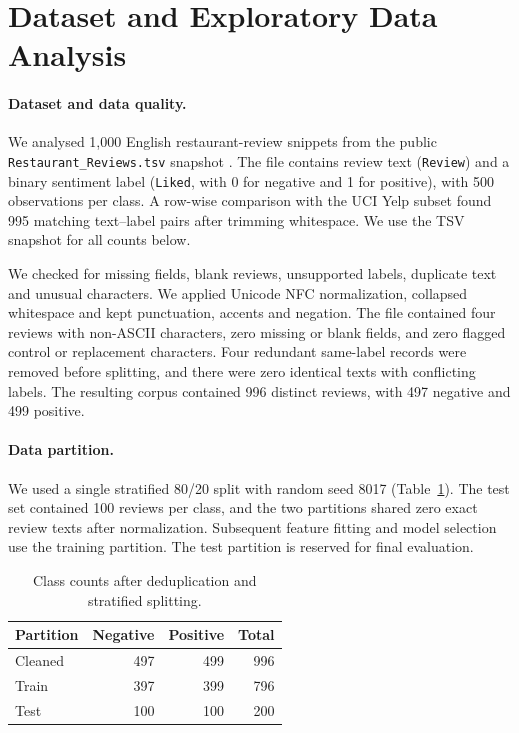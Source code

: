 \section{Dataset and Exploratory Data Analysis}
\label{sec:data-eda}

\paragraph{Dataset and data quality.}
We analysed 1,000 English restaurant-review snippets from the public
\texttt{Restaurant\_Reviews.tsv} snapshot
\citep{rajagopal-restaurant-reviews}. The file contains review text
(\texttt{Review}) and a binary sentiment label (\texttt{Liked}, with 0
for negative and 1 for positive), with 500 observations per class.
A row-wise comparison with the UCI Yelp subset \citep{kotzias-sentiment}
found 995 matching text--label pairs after trimming whitespace.
We use the TSV snapshot for all counts below.

We checked for missing fields, blank reviews, unsupported labels,
duplicate text and unusual characters. We applied Unicode NFC
normalization, collapsed whitespace and kept punctuation, accents and
negation. The file contained four reviews with non-ASCII characters,
zero missing or blank fields, and zero flagged control or replacement
characters. Four redundant same-label records were removed before
splitting, and there were zero identical texts with conflicting labels.
The resulting corpus contained 996 distinct reviews, with 497 negative
and 499 positive.

\paragraph{Data partition.}
We used a single stratified 80/20 split with random seed 8017
(Table~\ref{tab:data-eda-split}). The test set contained 100 reviews
per class, and the two partitions shared zero exact review texts after
normalization. Subsequent feature fitting and model selection use the
training partition. The test partition is reserved for final evaluation.

\begin{table}[t]
  \caption{Class counts after deduplication and stratified splitting.}
  \label{tab:data-eda-split}
  \centering
  \begin{tabular}{lrrr}
    \hline
    Partition & Negative & Positive & Total \\
    \hline
    Cleaned & 497 & 499 & 996 \\
    Train & 397 & 399 & 796 \\
    Test & 100 & 100 & 200 \\
    \hline
  \end{tabular}
\end{table}


